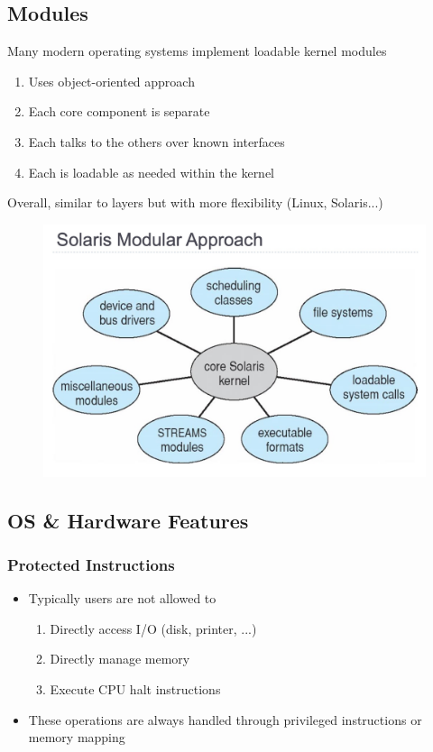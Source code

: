 \documentclass[11pt]{article}
\theoremstyle{definition}
\begin{document}
        \subsection{Modules}
        \hspace{1cm} Many modern operating systems implement loadable kernel modules
        \begin{enumerate}
            \item Uses object-oriented approach
            \item Each core component is separate
            \item Each talks to the others over known interfaces
            \item Each is loadable as needed within the kernel
        \end{enumerate}
        \hspace{1cm} Overall, similar to layers but with more flexibility (Linux, Solaris...)
        \begin{figure}[htbp]
                \centering
                \includegraphics[width=0.65\linewidth]{img/Solaris_Modular_Approach.jpg}
                \label{fig:enter-label}
            \end{figure}
        \subsection{OS \& Hardware Features}
            \subsubsection{Protected Instructions}
                \begin{itemize}
                    \item Typically users are not allowed to
                    \begin{enumerate}
                        \item Directly access I/O (disk, printer, ...)
                        \item Directly manage memory
                        \item Execute CPU halt instructions
                    \end{enumerate}
                    \item These operations are always handled through privileged instructions or memory mapping
                \end{itemize}
            \clearpage
\end{document}
